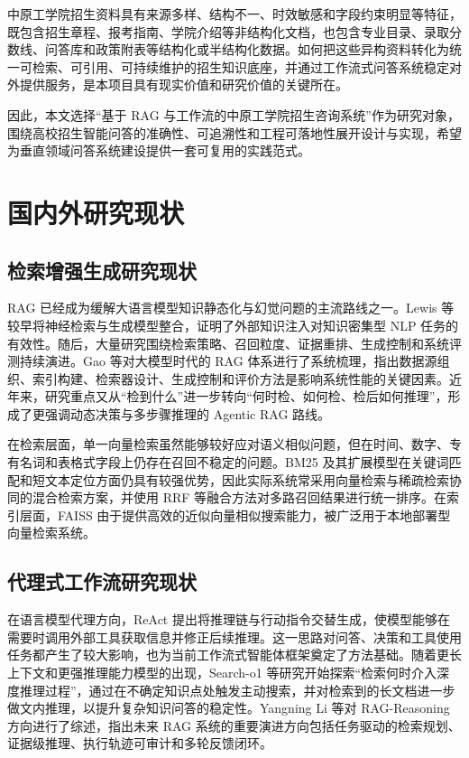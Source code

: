 \documentclass[UTF8,zihao=-4,oneside,fontset=windows]{ctexbook}
\numberwithin{equation}{chapter}
\begin{document}
中原工学院招生资料具有来源多样、结构不一、时效敏感和字段约束明显等特征，既包含招生章程、报考指南、学院介绍等非结构化文档，也包含专业目录、录取分数线、问答库和政策附表等结构化或半结构化数据。如何把这些异构资料转化为统一可检索、可引用、可持续维护的招生知识底座，并通过工作流式问答系统稳定对外提供服务，是本项目具有现实价值和研究价值的关键所在。

因此，本文选择“基于 RAG 与工作流的中原工学院招生咨询系统”作为研究对象，围绕高校招生智能问答的准确性、可追溯性和工程可落地性展开设计与实现，希望为垂直领域问答系统建设提供一套可复用的实践范式。

\section{国内外研究现状}
\subsection{检索增强生成研究现状}
RAG 已经成为缓解大语言模型知识静态化与幻觉问题的主流路线之一。Lewis 等较早将神经检索与生成模型整合，证明了外部知识注入对知识密集型 NLP 任务的有效性\cite{lewis2020rag}。随后，大量研究围绕检索策略、召回粒度、证据重排、生成控制和系统评测持续演进。Gao 等对大模型时代的 RAG 体系进行了系统梳理，指出数据源组织、索引构建、检索器设计、生成控制和评价方法是影响系统性能的关键因素\cite{gao2023survey}。近年来，研究重点又从“检到什么”进一步转向“何时检、如何检、检后如何推理”，形成了更强调动态决策与多步骤推理的 Agentic RAG 路线\cite{singh2025survey,agenticrag}。

在检索层面，单一向量检索虽然能够较好应对语义相似问题，但在时间、数字、专有名词和表格式字段上仍存在召回不稳定的问题。BM25 及其扩展模型在关键词匹配和短文本定位方面仍具有较强优势\cite{robertson2009bm25}，因此实际系统常采用向量检索与稀疏检索协同的混合检索方案，并使用 RRF 等融合方法对多路召回结果进行统一排序\cite{cormack2009rrf}。在索引层面，FAISS 由于提供高效的近似向量相似搜索能力，被广泛用于本地部署型向量检索系统\cite{johnson2017faiss}。

\subsection{代理式工作流研究现状}
在语言模型代理方向，ReAct 提出将推理链与行动指令交替生成，使模型能够在需要时调用外部工具获取信息并修正后续推理\cite{react2023}。这一思路对问答、决策和工具使用任务都产生了较大影响，也为当前工作流式智能体框架奠定了方法基础。随着更长上下文和更强推理能力模型的出现，Search-o1 等研究开始探索“检索何时介入深度推理过程”，通过在不确定知识点处触发主动搜索，并对检索到的长文档进一步做文内推理，以提升复杂知识问答的稳定性\cite{searcho1}。Yangning Li 等对 RAG-Reasoning 方向进行了综述，指出未来 RAG 系统的重要演进方向包括任务驱动的检索规划、证据级推理、执行轨迹可审计和多轮反馈闭环\cite{agenticrag}。
\end{document}
